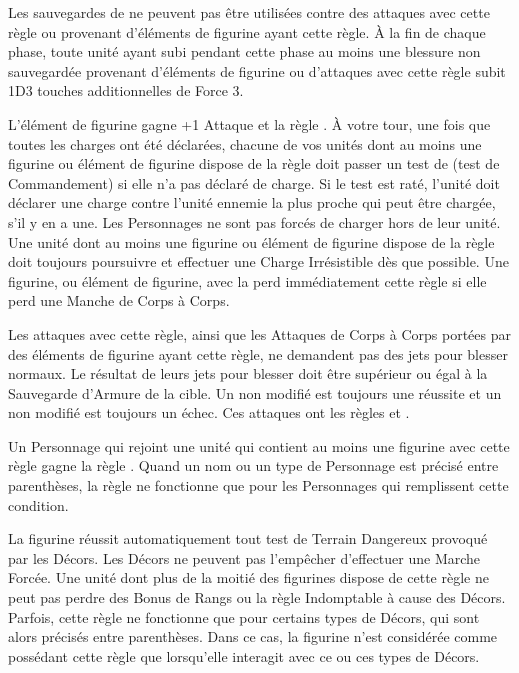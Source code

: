 
Les sauvegardes de \regeneration{} ne peuvent pas être utilisées contre des attaques avec cette règle ou provenant d'éléments de figurine ayant cette règle. À la fin de chaque phase, toute unité ayant subi pendant cette phase au moins une blessure non sauvegardée provenant d'éléments de figurine ou d'attaques avec cette règle subit 1D3 touches additionnelles de Force 3.


L'élément de figurine gagne +1 Attaque et la règle \immunetopsychology{}. À votre tour, une fois que toutes les charges ont été déclarées, chacune de vos unités dont au moins une figurine ou élément de figurine dispose de la règle \frenzy{} doit passer un test de \frenzy{} (test de Commandement) si elle n'a pas déclaré de charge. Si le test est raté, l'unité doit déclarer une charge contre l'unité ennemie la plus proche qui peut être chargée, s'il y en a une. Les Personnages ne sont pas forcés de charger hors de leur unité. Une unité dont au moins une figurine ou élément de figurine dispose de la règle \frenzy{} doit toujours poursuivre et effectuer une Charge Irrésistible dès que possible. Une figurine, ou élément de figurine, avec la \frenzy{} perd immédiatement cette règle si elle perd une Manche de Corps à Corps.


Les attaques avec cette règle, ainsi que les Attaques de Corps à Corps portées par des éléments de figurine ayant cette règle, ne demandent pas des jets pour blesser normaux. Le résultat de leurs jets pour blesser doit être supérieur ou égal à la Sauvegarde d'Armure de la cible. Un  non modifié est toujours une réussite et un  non modifié est toujours un échec. Ces attaques ont les règles \flamingattacks{} et .


Un Personnage qui rejoint une unité qui contient au moins une figurine avec cette règle gagne la règle \stubborn{}. Quand un nom ou un type de Personnage est précisé entre parenthèses, la règle ne fonctionne que pour les Personnages qui remplissent cette condition.


La figurine réussit automatiquement tout test de Terrain Dangereux provoqué par les Décors. Les Décors ne peuvent pas l'empêcher d'effectuer une Marche Forcée. Une unité dont plus de la moitié des figurines dispose de cette règle ne peut pas perdre des Bonus de Rangs ou la règle Indomptable à cause des Décors. Parfois, cette règle ne fonctionne que pour certains types de Décors, qui sont alors précisés entre parenthèses. Dans ce cas, la figurine n'est considérée comme possédant cette règle que lorsqu'elle interagit avec ce ou ces types de Décors.

